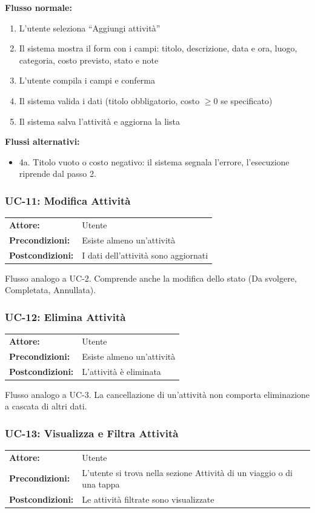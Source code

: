 \documentclass[12pt, a4paper]{article}
\makeatletter
\newcommand{\ucblock}[3]{%
  \noindent
  \begin{tabular}{@{}ll@{}}
    \textbf{Attore:}         & #1 \\
    \textbf{Precondizioni:}  & #2 \\
    \textbf{Postcondizioni:} & #3 \\
  \end{tabular}%
  \medskip
}
\makeatother
\begin{document}
\noindent\textbf{Flusso normale:}
\begin{enumerate}[leftmargin=1.5em, itemsep=1pt]
  \item L'utente seleziona ``Aggiungi attività''
  \item Il sistema mostra il form con i campi: titolo, descrizione, data e ora,
    luogo, categoria, costo previsto, stato e note
  \item L'utente compila i campi e conferma
  \item Il sistema valida i dati (titolo obbligatorio, costo \(\geq 0\) se specificato)
  \item Il sistema salva l'attività e aggiorna la lista
\end{enumerate}

\noindent\textbf{Flussi alternativi:}
\begin{itemize}[leftmargin=1.5em, itemsep=1pt]
  \item 4a. Titolo vuoto o costo negativo: il sistema segnala l'errore,
    l'esecuzione riprende dal passo 2.
\end{itemize}

\subsubsection{UC-11: Modifica Attività}

\ucblock{Utente}{Esiste almeno un'attività}{I dati dell'attività sono aggiornati}

\noindent Flusso analogo a UC-2. Comprende anche la modifica dello stato
(Da svolgere, Completata, Annullata).

\subsubsection{UC-12: Elimina Attività}

\ucblock{Utente}{Esiste almeno un'attività}{L'attività è eliminata}

\noindent Flusso analogo a UC-3. La cancellazione di un'attività non comporta
eliminazione a cascata di altri dati.

\subsubsection{UC-13: Visualizza e Filtra Attività}

\ucblock{Utente}{L'utente si trova nella sezione Attività di un viaggio o di una tappa}{Le attività filtrate sono visualizzate}
\end{document}
